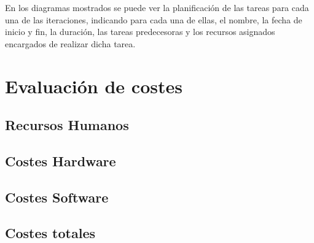 En los diagramas mostrados se puede ver la planificación de las tareas para cada una de las iteraciones, indicando para cada una de ellas, el nombre, la fecha de inicio y fin, la duración, las tareas predecesoras y los recursos asignados encargados de realizar dicha tarea.


\section{Evaluación de costes}
\subsection{Recursos Humanos}
\subsection{Costes Hardware}
\subsection{Costes Software}
\subsection{Costes totales}

